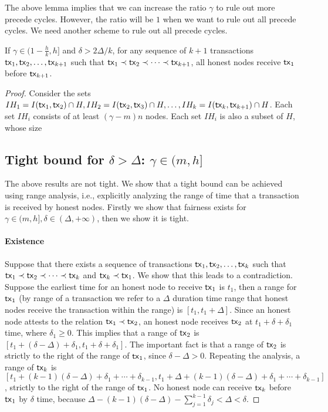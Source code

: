 \documentclass[runningheads]{llncs}
\begin{document}
The above lemma implies that we can increase the ratio $\gamma$ to rule out more precede cycles. However, the ratio will be $1$ when we want to rule out all precede cycles. We need another scheme to rule out all precede cycles. 

\begin{lemma}\label{lemma:cross-k}
    If $\gamma \in (1-\frac{h}{k}, h]$ and $\delta > 2\Delta/k$, for any sequence of $k+1$ transactions $\mathsf{tx}_1, \mathsf{tx}_2, \dots, \mathsf{tx}_{k+1}$ such that $\mathsf{tx}_1\prec \mathsf{tx}_2\prec \cdots \prec \mathsf{tx}_{k+1}$, all honest nodes receive $\mathsf{tx}_1$ before $\mathsf{tx}_{k+1}$.
\end{lemma}
\begin{proof}
    Consider the sets $IH_1 = I(\mathsf{tx}_1, \mathsf{tx}_2)\cap H, IH_2 = I(\mathsf{tx}_2, \mathsf{tx}_3)\cap H, \dots, IH_k=I(\mathsf{tx}_k, \mathsf{tx}_{k+1})\cap H$. Each set $IH_i$ consists of at least $(\gamma-m)n$ nodes. Each set $IH_i$ is also a subset of $H$, whose size \subsection{Tight bound for $\delta> \Delta$: $\gamma\in (m, h]$}
The above results are not tight. We show that a tight bound can be achieved using range analysis, i.e., explicitly analyzing the range of time that a transaction is received by honest nodes. Firstly we show that fairness exists for $\gamma\in(m,h], \delta\in(\Delta, +\infty)$, then we show it is tight. 

\paragraph{Existence} Suppose that there exists a sequence of transactions $\mathsf{tx}_1, \mathsf{tx}_2, \dots, \mathsf{tx}_k$ such that $\mathsf{tx}_1\prec \mathsf{tx}_2\prec \cdots \prec \mathsf{tx}_k$ and $\mathsf{tx}_k\prec \mathsf{tx}_1$. We show that this leads to a contradiction. Suppose the earliest time for an honest node to receive $\mathsf{tx}_1$ is $t_1$, then a range for $\mathsf{tx}_1$ (by range of a transaction we refer to a $\Delta$ duration time range that honest nodes receive the transaction within the range) is $[t_1, t_1+\Delta]$. Since an honest node attests to the relation $\mathsf{tx}_1\prec \mathsf{tx}_2$, an honest node receives $\mathsf{tx}_2$ at $t_1+\delta+\delta_1$ time, where $\delta_1\ge 0$. This implies that a range of $\mathsf{tx}_2$ is $[t_1+(\delta-\Delta)+\delta_1, t_1+\delta+\delta_1]$. The important fact is that a range of $\mathsf{tx}_2$ is strictly to the right of the range of $\mathsf{tx}_1$, since $\delta-\Delta>0$. Repeating the analysis, a range of $\mathsf{tx}_k$ is $[t_1+(k-1)(\delta-\Delta)+\delta_1+\cdots+\delta_{k-1}, t_1 + \Delta +(k-1)(\delta-\Delta)+\delta_1+\cdots+\delta_{k-1}]$, strictly to the right of the range of $\mathsf{tx}_1$. No honest node can receive $\mathsf{tx}_k$ before $\mathsf{tx}_1$ by $\delta$ time, because $\Delta - (k-1)(\delta-\Delta)-\sum_{j=1}^{k-1}\delta_{j} < \Delta < \delta$. 


\end{proof}
\end{document}
